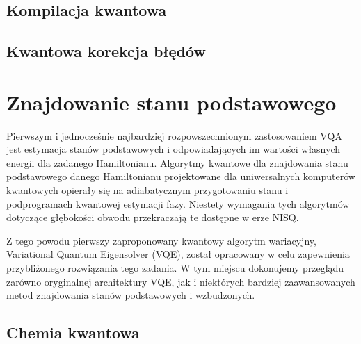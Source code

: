 \documentclass[a4paper,11pt]{article}
\begin{document}
\subsection{Kompilacja kwantowa}

\subsection{Kwantowa korekcja błędów}

\newpage
\section{Znajdowanie stanu podstawowego}

Pierwszym i jednocześnie najbardziej rozpowszechnionym zastosowaniem VQA jest estymacja stanów podstawowych i odpowiadających im wartości własnych energii dla zadanego Hamiltonianu. Algorytmy kwantowe dla znajdowania stanu podstawowego danego Hamiltonianu projektowane dla uniwersalnych komputerów kwantowych opierały się na adiabatycznym przygotowaniu stanu i podprogramach kwantowej estymacji fazy. Niestety wymagania tych algorytmów dotyczące głębokości obwodu przekraczają te dostępne w erze NISQ.


Z tego powodu pierwszy zaproponowany kwantowy algorytm wariacyjny, Variational Quantum Eigensolver (VQE), został opracowany w celu zapewnienia przybliżonego rozwiązania tego zadania.  W tym miejscu dokonujemy przeglądu zarówno oryginalnej architektury VQE, jak i niektórych bardziej zaawansowanych metod znajdowania stanów podstawowych i wzbudzonych. 


\subsection{Chemia kwantowa}


\end{document}
